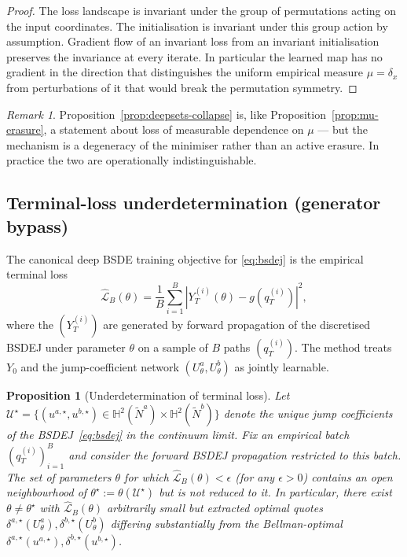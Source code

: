 \documentclass[11pt,a4paper]{article}
\newtheorem{proposition}[theorem]{Proposition}
\theoremstyle{definition}
\theoremstyle{remark}
\newtheorem{remark}[theorem]{Remark}
\newcommand{\Nt}{\widetilde{N}}
\begin{document}
\begin{proof}
The loss landscape is invariant under the group of permutations
acting on the input coordinates.  The initialisation is invariant
under this group action by assumption.  Gradient flow of an
invariant loss from an invariant initialisation preserves the
invariance at every iterate.  In particular the learned map has
no gradient in the direction that distinguishes the uniform
empirical measure $\mu = \delta_x$ from perturbations of it that
would break the permutation symmetry.
\end{proof}

\begin{remark}
Proposition~\ref{prop:deepsets-collapse} is, like
Proposition~\ref{prop:mu-erasure}, a statement about loss of
measurable dependence on $\mu$ --- but the mechanism is a
degeneracy of the minimiser rather than an active erasure.  In
practice the two are operationally indistinguishable.
\end{remark}

\subsection{Terminal-loss underdetermination (generator bypass)}

The canonical deep BSDE training objective for
\eqref{eq:bsdej} is the empirical terminal loss
\begin{equation}\label{eq:emp-loss}
\widehat{\mathcal{L}}_B(\theta) = \frac{1}{B} \sum_{i=1}^B
\left| Y_T^{(i)}(\theta) - g(q_T^{(i)}) \right|^2,
\end{equation}
where the $(Y_T^{(i)})$ are generated by forward propagation of
the discretised BSDEJ under parameter $\theta$ on a sample of $B$
paths $(q_T^{(i)})$.  The \citet{han2018} method treats $Y_0$ and
the jump-coefficient network $(U^a_\theta, U^b_\theta)$ as
jointly learnable.

\begin{proposition}[Underdetermination of terminal loss]\label{prop:underdetermination}
Let $\mathcal{U}^\star = \{(u^{a,\star}, u^{b,\star}) \in \mathbb{H}^2(\Nt^a) \times \mathbb{H}^2(\Nt^b)\}$
denote the unique jump coefficients of the BSDEJ~\eqref{eq:bsdej}
in the continuum limit.  Fix an empirical batch
$(q_T^{(i)})_{i=1}^B$ and consider the forward BSDEJ propagation
restricted to this batch.  The set of parameters
$\theta$ for which $\widehat{\mathcal{L}}_B(\theta) < \epsilon$
(for any $\epsilon > 0$) contains an open neighbourhood of
$\theta^\star := \theta(\mathcal{U}^\star)$ but is not reduced to
it.  In particular, there exist $\theta \neq \theta^\star$ with
$\widehat{\mathcal{L}}_B(\theta)$ arbitrarily small but extracted
optimal quotes $\delta^{a,\star}(U^a_\theta), \delta^{b,\star}(U^b_\theta)$
differing substantially from the Bellman-optimal
$\delta^{a,\star}(u^{a,\star}), \delta^{b,\star}(u^{b,\star})$.
\end{proposition}
\end{document}
